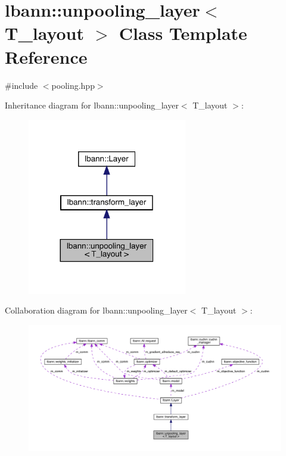\hypertarget{classlbann_1_1unpooling__layer}{}\section{lbann\+:\+:unpooling\+\_\+layer$<$ T\+\_\+layout $>$ Class Template Reference}
\label{classlbann_1_1unpooling__layer}


{\ttfamily \#include $<$pooling.\+hpp$>$}



Inheritance diagram for lbann\+:\+:unpooling\+\_\+layer$<$ T\+\_\+layout $>$\+:\nopagebreak
\begin{figure}[H]
\begin{center}
\leavevmode
\includegraphics[width=197pt]{classlbann_1_1unpooling__layer__inherit__graph}
\end{center}
\end{figure}


Collaboration diagram for lbann\+:\+:unpooling\+\_\+layer$<$ T\+\_\+layout $>$\+:\nopagebreak
\begin{figure}[H]
\begin{center}
\leavevmode
\includegraphics[width=350pt]{classlbann_1_1unpooling__layer__coll__graph}
\end{center}
\end{figure}
